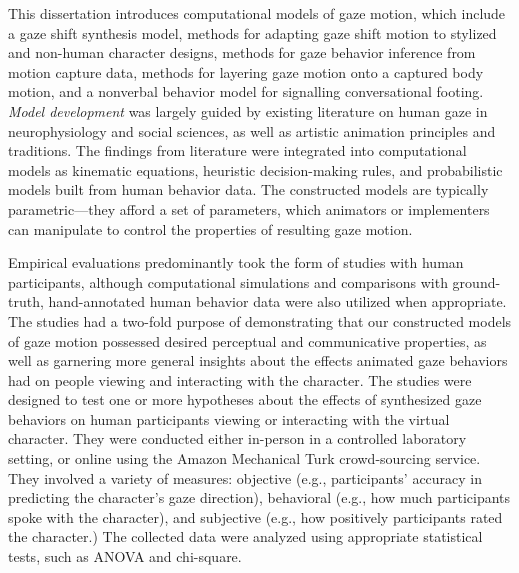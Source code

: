 This dissertation introduces computational models of gaze motion, which include a gaze shift synthesis model, methods for adapting gaze shift motion to stylized and non-human character designs, methods for gaze behavior inference from motion capture data, methods for layering gaze motion onto a captured body motion, and a nonverbal behavior model for signalling conversational footing. \emph{Model development} was largely guided by existing literature on human gaze in neurophysiology and social sciences, as well as artistic animation principles and traditions. The findings from literature were integrated into computational models as kinematic equations, heuristic decision-making rules, and probabilistic models built from human behavior data. The constructed models are typically parametric---they afford a set of parameters, which animators or implementers can manipulate to control the properties of resulting gaze motion.

Empirical evaluations predominantly took the form of studies with human participants, although computational simulations and comparisons with ground-truth, hand-annotated human behavior data were also utilized when appropriate. The studies had a two-fold purpose of demonstrating that our constructed models of gaze motion possessed desired perceptual and communicative properties, as well as garnering more general insights about the effects animated gaze behaviors had on people viewing and interacting with the character. The studies were designed to test one or more hypotheses about the effects of synthesized gaze behaviors on human participants viewing or interacting with the virtual character. They were conducted either in-person in a controlled laboratory setting, or online using the Amazon Mechanical Turk crowd-sourcing service. They involved a variety of measures: objective (e.g., participants' accuracy in predicting the character's gaze direction), behavioral (e.g., how much participants spoke with the character), and subjective (e.g., how positively participants rated the character.) The collected data were analyzed using appropriate statistical tests, such as ANOVA and chi-square.

